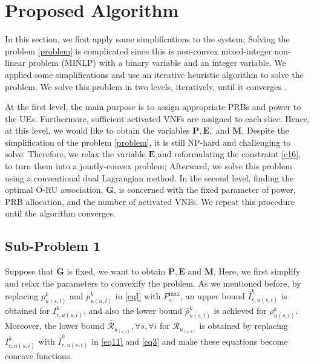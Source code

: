 \documentclass[lettersize,journal]{IEEEtran}
\begin{document}
\section{Proposed Algorithm}\label{proAlg}
\vspace{-1mm}
In this section, we first apply some simplifications to the system; Solving the problem \eqref{problem} is complicated since this is non-convex mixed-integer non-linear problem (MINLP) with a binary variable and an integer variable.
We applied some simplifications and use an iterative heuristic algorithm to solve the problem.
We solve this problem in two levels, iteratively, until it converges \cite{ali2018joint}.

At the first level, the main purpose is to assign appropriate PRBs and power to the UEs. Furthermore, sufficient activated VNFs are assigned to each slice. Hence, at this level, we would like to obtain the variables $\boldsymbol{P}, \boldsymbol{E},$ and $\boldsymbol{M}$.
Despite the simplification of the problem
\eqref{problem}, it is still NP-hard and challenging to solve. Therefore,
we relax the variable $\boldsymbol{E}$ \cite{lee2018dynamic,ali2018joint} and reformulating the constraint \eqref{c16},
to turn them into a jointly-convex problem; Afterward, we solve this problem using a conventional dual Lagrangian method.
In the second level, finding the optimal O-RU association, $ \boldsymbol{G}$, is concerned with the fixed parameter of power, PRB allocation, and the number of activated VNFs.
We repeat this procedure until the algorithm converges.
\vspace{-3mm}
\subsection{Sub-Problem 1}\label{sub1}
\vspace{-1mm}
Suppose that $\boldsymbol{G}$ is fixed, we want to obtain $\boldsymbol{P}, \boldsymbol{E}$ and $\boldsymbol{M}$.
Here, we first simplify and relax the parameters to convexify the problem.
As we mentioned before, by replacing $p_{u(s,l)}^{k}$ and $p_{u(n,l)}^{k}$ in \eqref{eqI} with $P^{\text{max}}_s$, an upper bound $\bar{I}_{r,u(s,i)}^{k}$ is obtained for $I_{r,u(s,i)}^{k}$, and also the lower bound $\bar{\rho}_{u(s,i)}^{k}$ is achieved
for $\rho_{u(s,i)}^{k}$.
Moreover, the lower bound $\bar{\mathcal{R}}_{u_{(s,i)}}, \forall s , \forall i$ for  ${\mathcal{R}}_{u_{(s,i)}}$ is obtained by replacing $I_{r,u(s,i)}^{k}$ with $\bar{I}_{r,u(s,i)}^{k}$ in \eqref{eq11} and \eqref{eq3} and make these equations become concave functions.
\end{document}
